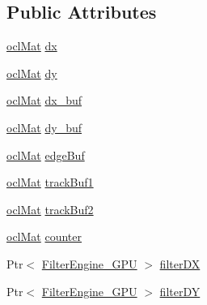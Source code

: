 \subsection*{Public Attributes}
\begin{DoxyCompactItemize}
\item 
\hyperlink{classcv_1_1ocl_1_1oclMat}{ocl\-Mat} \hyperlink{structcv_1_1ocl_1_1CannyBuf_aedc60c4eb6e272e0fd057e7c1bd34f38}{dx}
\item 
\hyperlink{classcv_1_1ocl_1_1oclMat}{ocl\-Mat} \hyperlink{structcv_1_1ocl_1_1CannyBuf_af466b6bc89d23e1ac946b11719200c61}{dy}
\item 
\hyperlink{classcv_1_1ocl_1_1oclMat}{ocl\-Mat} \hyperlink{structcv_1_1ocl_1_1CannyBuf_a5ea608e2537835d6202dc53d297995b5}{dx\-\_\-buf}
\item 
\hyperlink{classcv_1_1ocl_1_1oclMat}{ocl\-Mat} \hyperlink{structcv_1_1ocl_1_1CannyBuf_a7dd14efcc7919b33b748a39f8034579e}{dy\-\_\-buf}
\item 
\hyperlink{classcv_1_1ocl_1_1oclMat}{ocl\-Mat} \hyperlink{structcv_1_1ocl_1_1CannyBuf_ae9db0f2a4e6c10f3e05506bc3eaf6f9f}{edge\-Buf}
\item 
\hyperlink{classcv_1_1ocl_1_1oclMat}{ocl\-Mat} \hyperlink{structcv_1_1ocl_1_1CannyBuf_ab948679134597d21fc480eb2096bb4bc}{track\-Buf1}
\item 
\hyperlink{classcv_1_1ocl_1_1oclMat}{ocl\-Mat} \hyperlink{structcv_1_1ocl_1_1CannyBuf_a4c72991d85b66d28ed115db2ff43f6c0}{track\-Buf2}
\item 
\hyperlink{classcv_1_1ocl_1_1oclMat}{ocl\-Mat} \hyperlink{structcv_1_1ocl_1_1CannyBuf_a9d58f9b723d0c7092f402b06864359f5}{counter}
\item 
Ptr$<$ \hyperlink{classcv_1_1ocl_1_1FilterEngine__GPU}{Filter\-Engine\-\_\-\-G\-P\-U} $>$ \hyperlink{structcv_1_1ocl_1_1CannyBuf_a17647415647e9115dea6ff8f0a15c10e}{filter\-D\-X}
\item 
Ptr$<$ \hyperlink{classcv_1_1ocl_1_1FilterEngine__GPU}{Filter\-Engine\-\_\-\-G\-P\-U} $>$ \hyperlink{structcv_1_1ocl_1_1CannyBuf_adc242c792c269cc38ebc2c58da5d7427}{filter\-D\-Y}
\end{DoxyCompactItemize}


